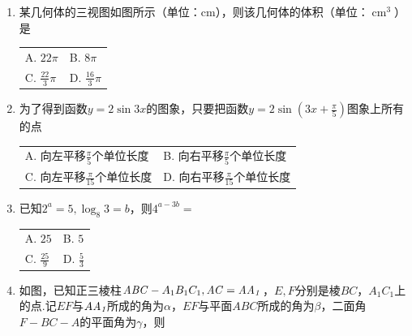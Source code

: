 \documentclass[UTF8]{ctexart}
\newcommand{\tmop}[1]{\ensuremath{\operatorname{#1}}}
\newcommand{\tmrsub}[1]{\ensuremath{_{\textrm{#1}}}}
\begin{document}
\begin{enumerate}
  \item
  某几何体的三视图如图所示（单位：cm），则该几何体的体积（单位：$\tmop{cm}^3$）是
  
  {\noindent}\begin{tabularx}{1.0\textwidth}{@{}X@{}@{}X@{}}
    A. $22 \pi$ & B. $8 \pi$\\
    C. $\frac{22}{3} \pi$ & D. $\frac{16}{3} \pi$
  \end{tabularx}
  
  
  \item 为了得到函数$y = 2 \sin 3 x$的图象，只要把函数$y = 2
  \sin \left( 3 x + \frac{\pi}{5} \right)$图象上所有的点
  
  {\noindent}\begin{tabularx}{1.0\textwidth}{@{}X@{}@{}X@{}}
    A. 向左平移$\frac{\pi}{5}$个单位长度 & B.
    向右平移$\frac{\pi}{5}$个单位长度\\
    C. 向左平移$\frac{\pi}{15}$个单位长度 & D.
    向右平移$\frac{\pi}{15}$个单位长度
  \end{tabularx}
  
  \item 已知$2^a = 5, \log_8 3 = b$，则$4^{a - 3 b} =$
  
  {\noindent}\begin{tabularx}{1.0\textwidth}{@{}X@{}@{}X@{}}
    A. $25$ & B. $5$\\
    C. $\frac{25}{9}$ & D. $\frac{5}{3}$
  \end{tabularx}
  
  \item 如图，已知正三棱柱$\mathit{ABC} - A_1 B_1 C_1, \mathit{AC} =
  \textit{AA\tmrsub{1}}$，$E, F$分别是棱$\mathit{BC}$，$A_1
  C_1$上的点.记$\mathit{EF}$与$A
  \textit{A\tmrsub{1}}$所成的角为$\alpha$，$\mathit{EF}$与平面$\mathit{ABC}$所成的角为$\beta$，二面角$F
  - \mathit{BC} - A$的平面角为$\gamma$，则
  

\end{enumerate}
\end{document}
